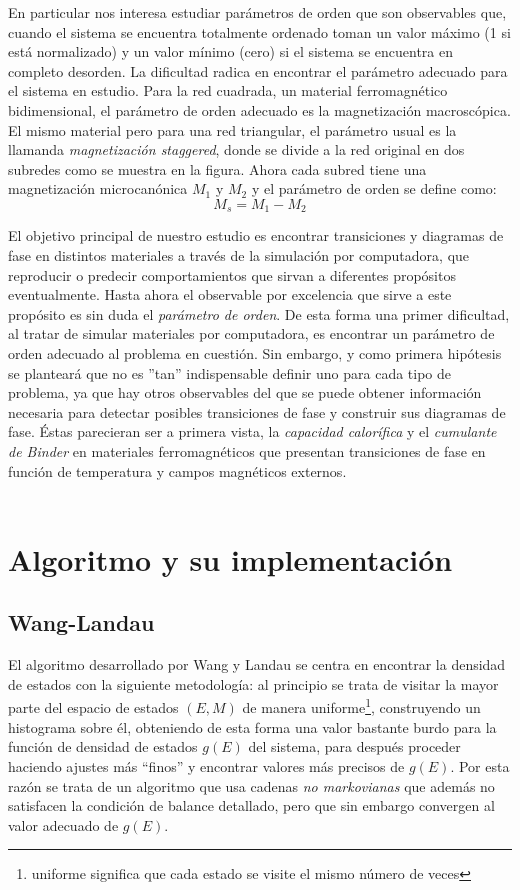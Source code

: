\documentclass[12pt]{book}
\begin{document}
En particular nos interesa estudiar parámetros de orden que son observables que,
 cuando el sistema se encuentra totalmente ordenado toman un valor máximo (1 si está 
 normalizado) y un valor mínimo (cero) si el sistema se encuentra en completo desorden.
 La dificultad radica en encontrar el parámetro adecuado para el sistema en estudio.
 Para la red cuadrada, un material ferromagnético bidimensional, el parámetro de orden adecuado 
 es la magnetización macroscópica. El mismo material pero para una red triangular, el parámetro usual es la llamanda \textit{magnetización staggered}, donde se divide a la red original en 
 dos subredes como se muestra en la figura. Ahora cada subred tiene una magnetización
 microcanónica $M_1$ y $M_2$ y el parámetro de orden se define como:
 \begin{equation}
  M_s = M_1 - M_2
 \end{equation}
 
El objetivo principal de nuestro estudio es encontrar transiciones y diagramas de fase en distintos materiales a través de la simulación por computadora, que reproducir o predecir comportamientos que sirvan a diferentes propósitos eventualmente. Hasta ahora el observable por excelencia que sirve a este propósito es sin duda el \textit{parámetro de orden}.
De esta forma una primer dificultad, al tratar de simular materiales por computadora, es encontrar un parámetro de orden adecuado al problema en cuestión. Sin embargo, y como primera hipótesis se planteará que no es ''tan'' indispensable definir uno para cada tipo de problema, ya que hay otros observables del que se puede obtener información necesaria para detectar posibles transiciones de fase y construir sus diagramas de fase. Éstas parecieran ser a primera vista, la \textit{capacidad calorífica} y el \textit{cumulante de Binder} en materiales ferromagnéticos que presentan transiciones de fase en función de temperatura y campos magnéticos externos.
\\
\\
 


\chapter{Algoritmo y su implementación}

\section{Wang-Landau}
El algoritmo desarrollado por Wang y Landau se centra en encontrar la densidad de 
estados con la siguiente metodología: al principio se trata de visitar la mayor parte
del espacio de estados ${(E,M)}$ de manera uniforme\footnote{uniforme significa que cada estado se visite el mismo número de veces}, construyendo un histograma sobre él, obteniendo de esta forma una valor bastante burdo para la función de densidad 
de estados $g(E)$ del sistema, para después proceder haciendo ajustes más 
``finos'' y encontrar valores más precisos de $g(E)$. Por esta razón se trata de un algoritmo que usa cadenas \textit{no markovianas} que además no satisfacen la condición de balance detallado, pero que sin embargo convergen al valor adecuado de $g(E)$.
\end{document}
